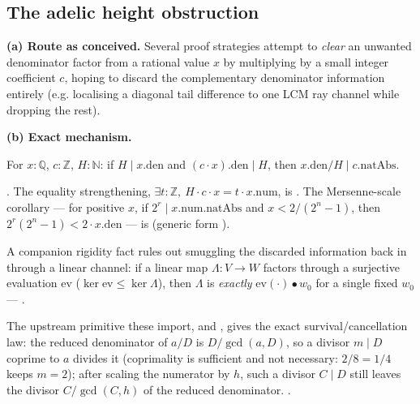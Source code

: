 \subsection{The adelic height obstruction}
\label{sec:adelic-height}

\textbf{(a) Route as conceived.} Several proof strategies attempt to
\emph{clear} an unwanted denominator factor from a rational value \(x\) by
multiplying by a small integer coefficient \(c\), hoping to discard the
complementary denominator information entirely (e.g. localising a diagonal
tail difference to one LCM ray channel while dropping the rest).

\textbf{(b) Exact mechanism.}
\begin{lem}
For \(x:\mathbb Q\), \(c:\mathbb Z\), \(H:\mathbb N\): if \(H\mid x.\mathrm{den}\)
and \((c\cdot x).\mathrm{den}\mid H\), then \(x.\mathrm{den}/H \mid
c.\mathrm{natAbs}\).
\end{lem}
. The equality
strengthening, \(\exists t:\mathbb Z,\ H\cdot c\cdot x = t\cdot x.\mathrm{num}\), is
. The
Mersenne-scale corollary — for positive \(x\), if \(2^r\mid x.\mathrm{num.natAbs}\)
and \(x<2/(2^n-1)\), then \(2^r(2^n-1)<2\cdot x.\mathrm{den}\) — is
 (generic form
).

A companion rigidity fact
rules out smuggling the discarded information back in through a linear
channel: if a linear map \(\Lambda:V\to W\) factors through a surjective
evaluation \(\mathrm{ev}\) (\(\ker\mathrm{ev}\le\ker\Lambda\)), then
\(\Lambda\) is \emph{exactly} \(\mathrm{ev}(\cdot)\bullet w_0\) for a single
fixed \(w_0\) —
.

The upstream
primitive these import,
 and
, gives the exact
survival/cancellation law: the reduced denominator of \(a/D\) is
\(D/\gcd(a,D)\), so a divisor \(m\mid D\) coprime to \(a\) divides it
(coprimality is sufficient and not necessary: \(2/8=1/4\) keeps \(m=2\)); after
scaling the numerator by \(h\), such a divisor \(C\mid D\) still leaves the
divisor \(C/\gcd(C,h)\) of the reduced denominator.  
.

